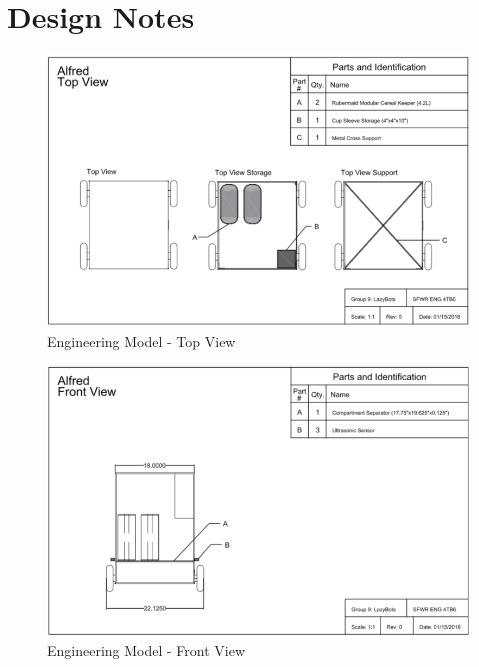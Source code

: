 \documentclass [10pt]{article}
\begin{document}
\newpage
\section {Design Notes}

\begin{figure}[h!]
	\centering
	\includegraphics [scale = 0.55] {figures/CAD_Top_View.png}
	\caption{Engineering Model - Top View}
\end{figure}
	
\begin{figure}
	\centering
	\includegraphics [scale = 0.55] {figures/CAD_Front_View.png}
	\caption{Engineering Model - Front View}
\end{figure}
	
\end{document}
